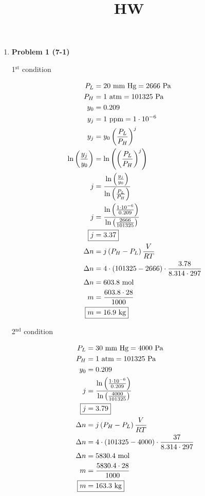 \documentclass[12pt]{article}
\title{HW}
\date{}
\begin{document}

\begin{enumerate}
    \item \textbf{Problem 1 (7-1)}
    
    1$^{\text{st}}$ condition

    \begin{align*}
        P_L &= 20 \text{ mm Hg} = 2666 \text{ Pa} \\
        P_H &= 1 \text{ atm} = 101325 \text{ Pa} \\
        y_0 &= 0.209 \\
        y_j &= 1 \text{ ppm} = 1\cdot10^{-6} \\
        y_j &= y_0 \left(\frac{P_L}{P_H}\right)^j \\
        \ln\left(\frac{y_j}{y_0}\right) &= \ln\left(\left(\frac{P_L}{P_H}\right)^j\right) \\
        j &= \frac{\ln\left(\frac{y_j}{y_0}\right)}{\ln\left(\frac{P_L}{P_H}\right)} \\
        j &= \frac{\ln\left(\frac{1\cdot10^{-6}}{0.209}\right)}{\ln\left(\frac{2666}{101325}\right)} \\
        \Aboxed{j &= 3.37} \\
        \Delta n &= j \left(P_H - P_L\right) \frac{V}{RT} \\
        \Delta n &= 4 \cdot \left(101325 - 2666\right)  \cdot \frac{3.78}{8.314 \cdot 297} \\
        \Delta n &= 603.8 \text{ mol} \\
        m &= \frac{603.8 \cdot 28}{1000} \\
        \Aboxed{m &= 16.9 \text{ kg}}
    \end{align*}

    2$^{\text{nd}}$ condition

    \begin{align*}
        P_L &= 30 \text{ mm Hg} = 4000 \text{ Pa} \\
        P_H &= 1 \text{ atm} = 101325 \text{ Pa} \\
        y_0 &= 0.209 \\
        j &= \frac{\ln\left(\frac{1\cdot10^{-6}}{0.209}\right)}{\ln\left(\frac{4000}{101325}\right)} \\
        \Aboxed{j &= 3.79} \\
        \Delta n &= j \left(P_H - P_L\right) \frac{V}{RT} \\
        \Delta n &= 4 \cdot \left(101325 - 4000\right)  \cdot \frac{37}{8.314 \cdot 297} \\
        \Delta n &= 5830.4 \text{ mol} \\
        m &= \frac{5830.4 \cdot 28}{1000} \\
        \Aboxed{m &= 163.3 \text{ kg}}
    \end{align*}


\end{enumerate}
\end{document}
